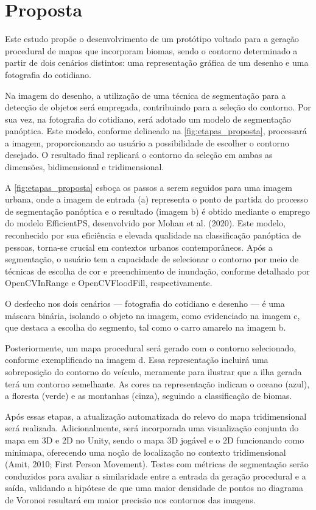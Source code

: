 \section{Proposta}

Este estudo propõe o desenvolvimento de um protótipo voltado para a geração procedural de mapas que incorporam biomas, sendo o contorno determinado a partir de dois cenários distintos: uma representação gráfica de um desenho e uma fotografia do cotidiano.

Na imagem do desenho, a utilização de uma técnica de segmentação para a detecção de objetos será empregada, contribuindo para a seleção do contorno. Por sua vez, na fotografia do cotidiano, será adotado um modelo de segmentação panóptica. Este modelo, conforme delineado na \cref{fig:etapas_proposta}, processará a imagem, proporcionando ao usuário a possibilidade de escolher o contorno desejado. O resultado final replicará o contorno da seleção em ambas as dimensões, bidimensional e tridimensional.

A \cref{fig:etapas_proposta} esboça os passos a serem seguidos para uma imagem urbana, onde a imagem de entrada (a) representa o ponto de partida do processo de segmentação panóptica e o resultado (imagem b) é obtido mediante o emprego do modelo EfficientPS, desenvolvido por Mohan et al. (2020). Este modelo, reconhecido por sua eficiência e elevada qualidade na classificação panóptica de pessoas, torna-se crucial em contextos urbanos contemporâneos. Após a segmentação, o usuário tem a capacidade de selecionar o contorno por meio de técnicas de escolha de cor e preenchimento de inundação, conforme detalhado por OpenCVInRange e OpenCVFloodFill, respectivamente.

O desfecho nos dois cenários — fotografia do cotidiano e desenho — é uma máscara binária, isolando o objeto na imagem, como evidenciado na imagem c, que destaca a escolha do segmento, tal como o carro amarelo na imagem b.

Posteriormente, um mapa procedural será gerado com o contorno selecionado, conforme exemplificado na imagem d. Essa representação incluirá uma sobreposição do contorno do veículo, meramente para ilustrar que a ilha gerada terá um contorno semelhante. As cores na representação indicam o oceano (azul), a floresta (verde) e as montanhas (cinza), seguindo a classificação de biomas.

Após essas etapas, a atualização automatizada do relevo do mapa tridimensional será realizada. Adicionalmente, será incorporada uma visualização conjunta do mapa em 3D e 2D no Unity, sendo o mapa 3D jogável e o 2D funcionando como minimapa, oferecendo uma noção de localização no contexto tridimensional (Amit, 2010; First Person Movement). Testes com métricas de segmentação serão conduzidos para avaliar a similaridade entre a entrada da geração procedural e a saída, validando a hipótese de que uma maior densidade de pontos no diagrama de Voronoi resultará em maior precisão nos contornos das imagens.

